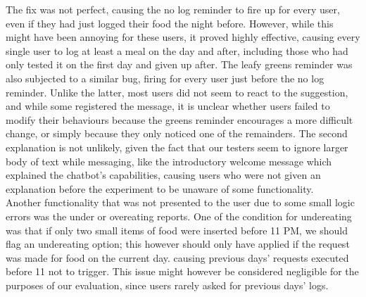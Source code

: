 The fix was not perfect, causing the no log reminder to fire up for every user, even if they had just logged their food the night before. However, while this might have been annoying for these users, it proved highly effective, causing every single user to log at least a meal on the day and after, including those who had only tested it on the first day and given up after. The leafy greens reminder was also subjected to a similar bug, firing for every user just before the no log reminder. Unlike the latter, most users did not seem to react to the suggestion, and while some registered the message, it is unclear whether users failed to modify their behaviours because the greens reminder encourages a more difficult change, or simply because they only noticed one of the remainders. The second explanation is not unlikely, given the fact that our testers seem to ignore larger body of text while messaging, like the introductory welcome message which explained the chatbot's capabilities, causing users who were not given an explanation before the experiment to be unaware of some functionality. \\
Another functionality that was not presented to the user due to some small logic errors was the under or overeating reports. One of the condition for undereating was that if only two small items of food were inserted before 11 PM, we should flag an undereating option; this however should only have applied if the request was made for food on the current day. causing previous days' requests executed before 11 not to trigger. This issue might however be considered negligible for the purposes of our evaluation, since users rarely asked for previous days' logs.
